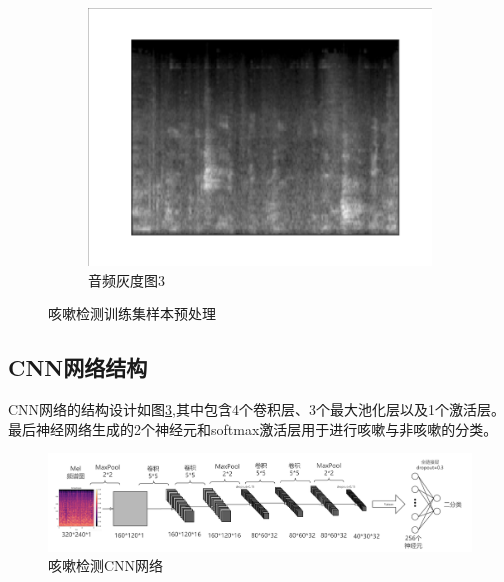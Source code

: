 \begin{figure}[h]
\begin{subfigure}{0.3\textwidth}
      \end{subfigure}
        \begin{subfigure}{0.3\textwidth}
        \includegraphics[width=\linewidth]{figures/音频处理3.png}
        \caption{音频灰度图3}
        \label{fig:huidu3}
      \end{subfigure}
      \caption{咳嗽检测训练集样本预处理}
      \label{fig:huidu-image}
    \end{figure}

\subsection{CNN网络结构}
CNN网络的结构设计如图\ref{fig:cnn001},其中包含4个卷积层、3个最大池化层以及1个激活层。最后神经网络生成的2个神经元和softmax激活层用于进行咳嗽与非咳嗽的分类。

\begin{figure}[h]
    \centering
    \includegraphics[width=1.1\textwidth]{figures/cnn1.png}
    \caption{咳嗽检测CNN网络}
    \label{fig:cnn001}
\end{figure}

